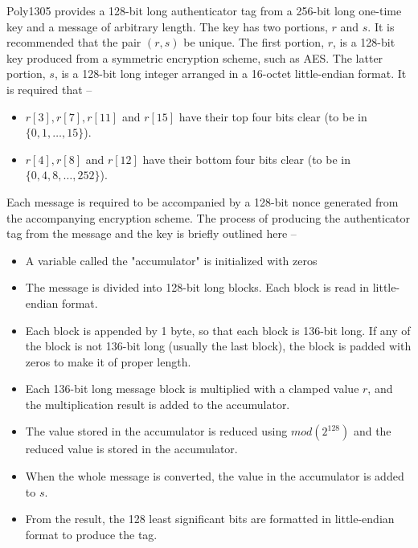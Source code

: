\documentclass[a4paper]{cas-sc}
\begin{document}
Poly1305 provides a 128-bit long authenticator tag from a 256-bit long one-time key and a message of arbitrary length. The key has two portions, $r$ and $s$. It is recommended that the pair $(r,s)$ be unique. The first portion, $r$, is a 128-bit key produced from a symmetric encryption scheme, such as AES. The latter portion, $s$, is a 128-bit long integer arranged in a 16-octet little-endian format. It is required that --
\begin{itemize}
    \item $r[3], r[7], r[11]$ and $r[15]$ have their top four bits clear (to be in $\{0,1,\ldots,15\}$).
    \item $r[4], r[8]$ and $r[12]$ have their bottom four bits clear (to be in $\{0,4,8,\ldots,252\}$).
\end{itemize}

Each message is required to be accompanied by a 128-bit nonce generated from the accompanying encryption scheme. The process of producing the authenticator tag from the message and the key is briefly outlined here --
\begin{itemize}
    \item A variable called the "accumulator" is initialized with zeros
    \item The message is divided into 128-bit long blocks. Each block is read in little-endian format.
    \item Each block is appended by 1 byte, so that each block is 136-bit long. If any of the block is not 136-bit long (usually the last block), the block is padded with zeros to make it of proper length.
    \item Each 136-bit long message block is multiplied with a clamped value $r$, and the multiplication result is added to the accumulator.
    \item The value stored in the accumulator is reduced using $mod(2^{128})$ and the reduced value is stored in the accumulator.
    \item When the whole message is converted, the value in the accumulator is added to $s$.
    \item From the result, the 128 least significant bits are formatted in little-endian format to produce the tag.
\end{itemize}
\end{document}
